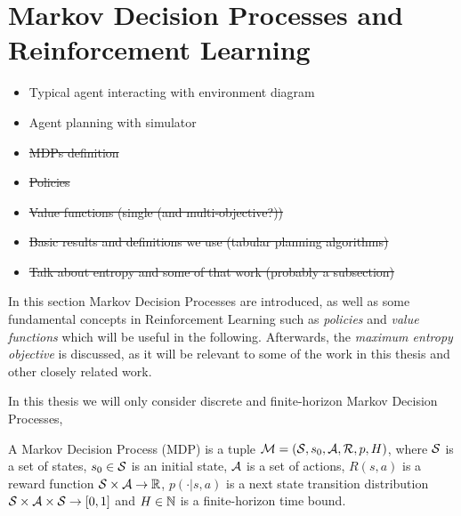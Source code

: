 \section{Markov Decision Processes and Reinforcement Learning}
\label{sec:2-1-rl}

    \begin{itemize}
        \item Typical agent interacting with environment diagram 
        \item Agent planning with simulator 
        \item \st{MDPs definition}
        \item \st{Policies}
        \item \st{Value functions (single (and multi-objective?))}
        \item \st{Basic results and definitions we use (tabular planning algorithms)}
        \item \st{Talk about entropy and some of that work (probably a subsection)}
    \end{itemize}


    In this section Markov Decision Processes are introduced, as well as some fundamental concepts in Reinforcement Learning such as \textit{policies} and \textit{value functions} which will be useful in the following. Afterwards, the \textit{maximum entropy objective} is discussed, as it will be relevant to some of the work in this thesis and other closely related work. 

    In this thesis we will only consider discrete and finite-horizon Markov Decision Processes, 

    \begin{defn}
        \label{def:mdp}
        A \textnormal{Markov Decision Process} (MDP) is a tuple $\mathcal{M}=(\mathcal{S},s_0,\mathcal{A},\mathcal{R},p,H)$, where $\mathcal{S}$ is a set of states, $s_0\in\mathcal{S}$ is an initial state, $\mathcal{A}$ is a set of actions, $R(s,a)$ is a reward function $\mathcal{S}\times \mathcal{A}\rightarrow \mathbb{R}$, $p(\cdot | s,a)$ is a next state transition distribution $\mathcal{S} \times \mathcal{A} \times \mathcal{S} \rightarrow [0,1]$ and $H\in\mathbb{N}$ is a finite-horizon time bound. 
    \end{defn}

